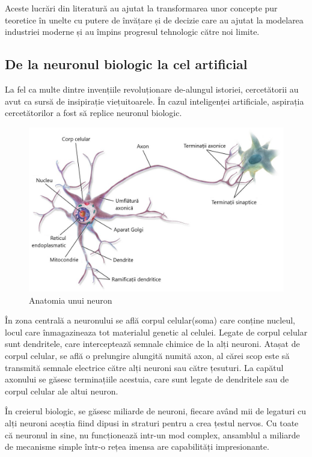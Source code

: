 Aceste lucrări din literatură au ajutat la transformarea unor concepte pur teoretice în unelte cu putere de învățare și de decizie care au ajutat la modelarea industriei moderne și au împins progresul tehnologic către noi limite. 

\subsection{De la neuronul biologic la cel artificial}
    La fel ca multe dintre invențiile revoluționare de-alungul istoriei, cercetătorii au avut ca sursă de insipirație viețuitoarele. În cazul inteligenței artificiale, aspirația cercetătorilor a fost să replice neuronul biologic. 
    
    \begin{figure}[h]
         \centering 
         \includegraphics[width=.75\textwidth]{images/structura-unui-neuron.jpg}
         \caption{Anatomia unui neuron \cite{neuron-anatomy}}
    \end{figure}
    
    În zona centrală a neuronului se află corpul celular(soma) care conține nucleul, locul care înmagazineaza tot materialul genetic al celulei. Legate de corpul celular sunt dendritele, care interceptează semnale chimice de la alți neuroni. Atașat de corpul celular, se află o prelungire alungită numită axon, al cărei scop este să transmită semnale electrice către alți neuroni sau către țesuturi. La capătul axonului se găsesc terminațiile acestuia, care sunt legate de dendritele sau de corpul celular ale altui neuron. 

    În creierul biologic, se găsesc miliarde de neuroni, fiecare având mii de legaturi cu alți neuroni aceștia fiind dipusi in straturi pentru a crea țestul nervos. Cu toate că neuronul in sine, nu funcționează intr-un mod complex, ansamblul a miliarde de mecanisme simple într-o rețea imensa are capabilități impresionante. 

